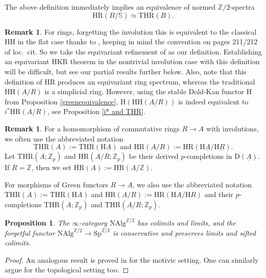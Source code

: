 \documentclass[10pt]{amsart}
\newtheorem{prop}[thm]{Proposition}
\theoremstyle{definition}
\newtheorem{rmk}[thm]{Remark}
\numberwithin{equation}{section}
\newcommand{\Sphere}{\mathbb{S}}
\newcommand{\Z}{\mathbb{Z}}
\newcommand{\rD}{\mathrm{D}}
\newcommand{\rH}{\mathrm{H}}
\newcommand{\ul}{\underline}
\newcommand{\NAlg}{\mathrm{NAlg}}
\newcommand{\Sp}{\mathrm{Sp}}
\newcommand{\HH}{\mathrm{HH}}
\newcommand{\HR}{\mathrm{HR}}
\newcommand{\THR}{\mathrm{THR}}
\begin{document}
The above definition immediately implies an equivalence of normed $\Z/2$-spectra
\[
\HR(B/\Sphere)
\simeq
\THR(B).
\]

\begin{rmk}
For rings, forgetting the involution this is equivalent to the classical $\HH$ in the flat case thanks to \cite[Lemma 2.5]{BMS19},  keeping in mind the convention on pages 211/212 of loc.\ cit.
So we take the equivariant refinement of  \cite[Lemma 2.5]{BMS19} as our definition. Establishing an equivariant HKR theorem in the nontrivial involution case with this definition will be difficult, but see our partial results further below. Also, note that this definition of $\HR$ produces an equivariant ring spectrum, whereas the traditional $\HH(A/R)$ is a simplicial ring. 
However, using the stable Dold-Kan functor $\rH$ from  Proposition \ref{greenequivalence},
$\rH(\HH(A/R))$ is indeed equivalent to $i^*\HR(A/R)$,
see Proposition \ref{i* and THR}.
\end{rmk}

\begin{rmk}\label{shortnotation}
For a homomorphism of commutative rings $R\to A$ with involutions,
we often use the abbreviated notation
\[
\THR(A)
:=
\THR(\rH \ul{A})
\text{ and }
\HR(A/R)
:=
\HR(\rH \ul{A}/\rH \ul{R}).
\]
Let $\THR(A;\Z_p)$ and $\HR(A/R;\Z_p)$ be their derived $p$-completions in $\rD(\ul{A})$.
If $R=\Z$,
then we set $\HR(A):=\HR(A/\Z)$.

For morphisms of Green functors $R\to A$, we also use the abbreviated notation $\THR(A):=\THR(\rH A)$ and $\HR(A/R):=\HR(\rH A/\rH R)$ and their $p$-completions $\THR(A;\Z_p)$ and $\THR(A/R;\Z_p)$.
\end{rmk}

\begin{prop}
\label{prop:NAlg has colimits}
The $\infty$-category $\NAlg^{\Z/2}$ has colimits and limits,
and the forgetful functor $\NAlg^{\Z/2}\to \Sp^{\Z/2}$ is conservative and preserves limits and sifted colimits.
\end{prop}
\begin{proof}
An analogous result is proved in \cite[Proposition 7.6(1),(2)]{BH21} for the motivic setting. 
One can similarly argue for the topological setting too. 
\end{proof}
\end{document}
